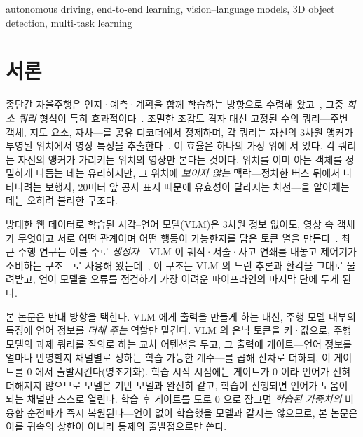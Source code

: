 \documentclass[conference]{IEEEtran}
\begin{document}
\begin{IEEEkeywords}
autonomous driving, end-to-end learning, vision--language models, 3D object
detection, multi-task learning
\end{IEEEkeywords}

\section{서론}
\label{sec:intro}

종단간 자율주행은 인지·예측·계획을 함께 학습하는 방향으로 수렴해
왔고~\cite{hu2023uniad,jiang2023vad}, 그중 \emph{희소 쿼리} 형식이 특히
효과적이다~\cite{sun2024sparsedrive,hipad2025}. 조밀한 조감도 격자 대신 고정된 수의
쿼리---주변 객체, 지도 요소, 자차---를 공유 디코더에서 정제하며, 각 쿼리는 자신의 3차원
앵커가 투영된 위치에서 영상 특징을 추출한다~\cite{lin2023sparse4dv3,zhu2021deformabledetr}.
이 효율은 하나의 가정 위에 서 있다. 각 쿼리는 자신의 앵커가 가리키는 위치의
영상만 본다는 것이다. 위치를 이미 아는 객체를 정밀하게 다듬는 데는 유리하지만, 그
위치에 \emph{보이지 않는} 맥락---정차한 버스 뒤에서 나타나려는 보행자, 20미터 앞 공사
표지 때문에 유효성이 달라지는 차선---을 알아채는 데는 오히려 불리한 구조다.

방대한 웹 데이터로 학습된 시각--언어 모델(VLM)은 3차원 정보 없이도, 영상 속 객체가
무엇이고 서로 어떤 관계이며 어떤 행동이 가능한지를 담은 토큰 열을
만든다~\cite{radford2021clip,wang2024qwen2vl}.
최근 주행 연구는 이를 주로 \emph{생성자}---VLM 이 궤적·서술·사고 연쇄를 내놓고 제어기가
소비하는 구조---로 사용해 왔는데~\cite{tian2024drivevlm,xu2024drivegpt4,sima2024drivelm},
이 구조는 VLM 의 느린 추론과 환각을 그대로 물려받고, 언어 모델을 오류를 점검하기 가장
어려운 파이프라인의 마지막 단에 두게 된다.

본 논문은 반대 방향을 택한다. VLM 에게 출력을 만들게 하는 대신, 주행 모델 내부의
특징에 언어 정보를 \emph{더해 주는} 역할만 맡긴다. VLM 의 은닉 토큰을 키·값으로, 주행
모델의 과제 쿼리를 질의로 하는 교차 어텐션을 두고, 그 출력에 게이트---언어
정보를 얼마나 반영할지 채널별로 정하는 학습 가능한 계수---를 곱해 잔차로 더하되, 이
게이트를 0 에서 출발시킨다(영초기화). 학습 시작 시점에는 게이트가 0 이라
언어가 전혀 더해지지 않으므로 모델은 기반 모델과 완전히 같고, 학습이 진행되면 언어가
도움이 되는 채널만 스스로 열린다. 학습 후 게이트를 도로 0 으로 잠그면 \emph{학습된
가중치의} 비융합 순전파가 즉시 복원된다---언어 없이 학습했을 모델과 같지는 않으므로,
본 논문은 이를 귀속의 상한이 아니라 통제의 출발점으로만 쓴다.
\end{document}
